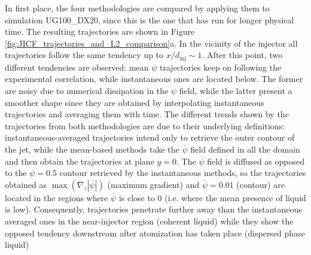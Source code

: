 In first place, the four methodologies are compared by applying them to simulation UG100\_DX20, since this is the one that has run for longer physical time. The resulting trajectories are shown in Figure \ref{fig:JICF_trajectories_and_L2_comparison}a. In the vicinity of the injector all trajectories follow the same tendency up to $x/d_\mathrm{inj} \sim 1$. After this point, two different tendencies are observed: mean $\psi$ trajectories keep on following the experimental correlation, while instantaneous ones are located below. The former are noisy due to numerical dissipation in the $\psi$ field, while the latter present a smoother shape since they are obtained by interpolating instantaneous trajectories and averaging them with time. The different trends shown by the trajectories from both methodologies are due to their underlying definitions: instantaneous-averaged trajectories intend only to retrieve the outer contour of the jet, while the mean-based methods take the $\overline{\psi}$ field defined in all the domain and then obtain the trajectories at plane $y = 0$. The $\overline{\psi}$ field is diffused as opposed to the $\psi = 0.5$ contour retrieved by the instantaneous methods, so the trajectories obtained as $\max \left( \nabla_z | \overline{\psi} | \right)$ (maximum gradient) and $\overline{\psi} = 0.01$ (contour) are located in the regions where $\overline{\psi}$ is close to $0$ (i.e. where the mean presence of liquid is low). Consequently, trajectories penetrate further away than the instantaneous averaged ones in the near-injector region (coherent liquid) while they show the opposed tendency downstream after atomization has taken place (dispersed phase liquid) \\

\clearpage


